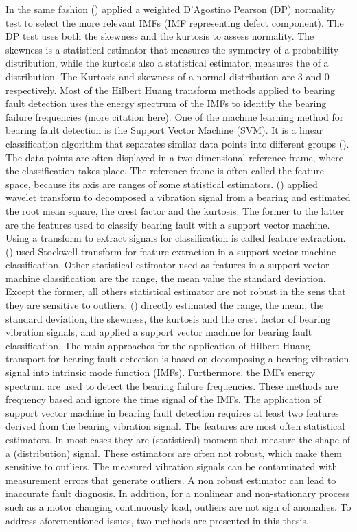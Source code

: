\documentclass[../Main/thesis.tex]{subfiles}
\begin{document}
In the same fashion (\cite{osman2014}) applied a weighted D'Agostino Pearson (DP) normality test to select the more relevant IMFs (IMF representing defect component). The DP test uses both the skewness and the kurtosis to assess normality.
The skewness is a statistical estimator that measures the symmetry of a probability distribution, while the kurtosis also a statistical estimator, measures the  of a distribution. The Kurtosis and skewness of a normal distribution are 3 and 0 respectively.
Most of the Hilbert Huang transform methods applied to bearing fault detection uses the energy spectrum of the IMFs to identify the bearing failure frequencies (more citation here).
\justify
One of the machine learning method for bearing fault detection is the Support Vector Machine (SVM). It is a linear classification algorithm that separates similar data points into different groups (\cite{vapnik1995}). The data points are  often displayed in a two dimensional reference frame, where the classification takes place. The reference frame is often called the feature space, because its axis are ranges of some statistical estimators. (\cite{konar2011}) applied wavelet transform to decomposed a vibration signal from a bearing and estimated the root mean square, the crest factor and the kurtosis. The former to the latter are the features used to classify bearing fault with a support vector machine. Using a transform to extract signals for classification is called feature extraction. (\cite{singh2018}) used Stockwell transform for feature extraction in a support vector machine classification. Other statistical estimator used as features in a support vector machine classification are the range, the mean value the standard deviation. Except the former, all others statistical estimator are not robust in the sens that they are sensitive to outliers. (\cite{kankar2010}) directly estimated the range, the mean, the standard deviation, the skewness, the kurtosis and the crest factor of bearing vibration signals, and applied a support vector machine for bearing fault classification.
\justify
The main approaches for the application of Hilbert Huang transport for bearing fault detection is based on decomposing a bearing vibration signal into intrinsic mode function (IMFs). Furthermore, the IMFs energy spectrum are used to detect the bearing failure frequencies. These methods are frequency based and ignore the time signal of the IMFs.
\justify
The application of support vector machine in bearing fault detection requires at least two features derived from the bearing vibration signal. The features are most often statistical estimators. In most cases they are (statistical) moment that measure the shape of a (distribution) signal. These estimators are often not robust, which make them sensitive to outliers. The measured vibration signals can be contaminated with measurement errors that generate outliers. A non robust estimator can lead to inaccurate fault diagnosis. In addition, for a nonlinear and non-stationary process such as a motor changing continuously load, outliers are not sign of anomalies. To address aforementioned issues, two methods are presented in this thesis. 
\end{document}
